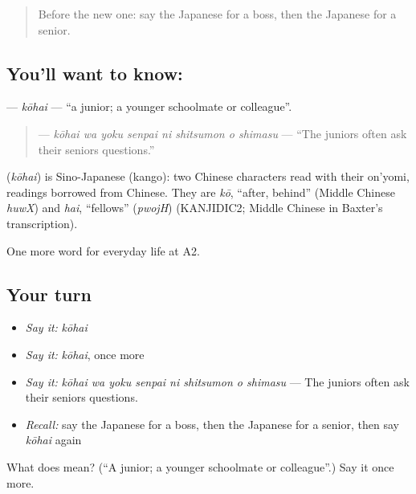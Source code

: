 \begin{quote}
Before the new one: say the Japanese for a boss, then the Japanese for a senior.
\end{quote}

\subsection*{You'll want to know: }
\textbf{} — \emph{kōhai} — \textquotedblleft{}a junior; a younger schoolmate or colleague\textquotedblright{}.

\begin{quote}
\textbf{    } — \emph{kōhai wa yoku senpai ni shitsumon o shimasu} — \textquotedblleft{}The juniors often ask their seniors questions.\textquotedblright{}
\end{quote}

\begin{cousinweb}
\textbf{} (\emph{kōhai}) is Sino-Japanese (kango): two Chinese characters read with their on'yomi, readings borrowed from Chinese. They are \emph{kō}, \textquotedblleft{}after, behind\textquotedblright{} (Middle Chinese \emph{huwX}) and \emph{hai}, \textquotedblleft{}fellows\textquotedblright{} (\emph{pwojH}) (KANJIDIC2; Middle Chinese in Baxter's transcription).
\end{cousinweb}

\begin{grammarlens}[title={What you've built}]
One more word for everyday life at A2.
\end{grammarlens}

\subsection*{Your turn}
\begin{itemize}
\raggedright
  \item \emph{Say it:} \emph{kōhai}
  \item \emph{Say it:} \emph{kōhai}, once more
  \item \emph{Say it:} \emph{kōhai wa yoku senpai ni shitsumon o shimasu} — The juniors often ask their seniors questions.
  \item \emph{Recall:} say the Japanese for a boss, then the Japanese for a senior, then say \emph{kōhai} again
\end{itemize}

\begin{tcolorbox}[breakable,colback=teal!4,colframe=teal!35!black,title={Before you move on}]
What does  mean? (\textquotedblleft{}A junior; a younger schoolmate or colleague\textquotedblright{}.) Say it once more.
\end{tcolorbox}
